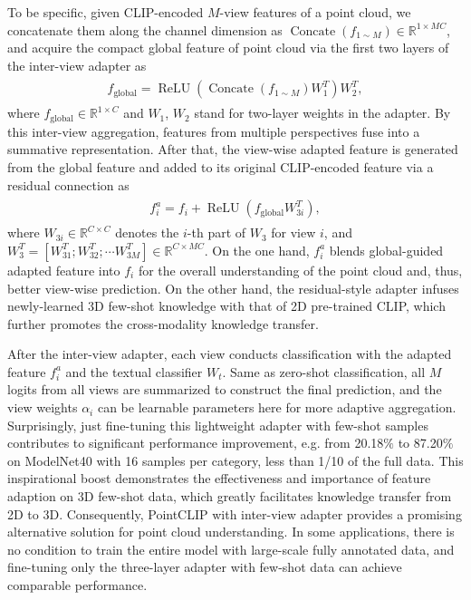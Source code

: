 \documentclass[10pt,twocolumn,letterpaper]{article}
\begin{document}
To be specific, given CLIP-encoded $M$-view features of a point cloud, we concatenate them along the channel dimension as  $\operatorname{Concate}(f_{1\sim M}) \in \mathbb{R}^{1 \times MC}$, and acquire the compact global feature of point cloud via the first two layers of the inter-view adapter as
\begin{align}
\label{global}
\begin{split}
    f_\mathrm{global} = \operatorname{ReLU}(\operatorname{Concate}(f_{1\sim M}) W_1^T)W_2^T,
\end{split}
\end{align}
where $f_\mathrm{global} \in \mathbb{R}^{1 \times C}$ and $W_1$, $W_2$ stand for two-layer weights in the adapter. By this inter-view aggregation, features from multiple perspectives fuse into a summative representation. After that, the view-wise adapted feature is generated from the global feature and added to its original CLIP-encoded feature via a residual connection as
\begin{align}
\label{clip_}
\begin{split}
    f_i^a = f_i + \operatorname{ReLU}(f_\mathrm{global} 
    W_{3i}^T),
\end{split}
\end{align}
where $W_{3i} \in \mathbb{R}^{C \times C}$ denotes the $i$-th part of $W_3$ for view $i$, and $W_{3}^T = [W_{31}^T; W_{32}^T;\cdots W_{3M}^T]\in \mathbb{R}^{C \times MC}$. On the one hand, $f_i^a$ blends global-guided adapted feature into $f_i$ for the overall understanding of the point cloud and, thus, better view-wise prediction. On the other hand, the residual-style adapter infuses newly-learned 3D few-shot knowledge with that of 2D pre-trained CLIP, which further promotes the cross-modality knowledge transfer.

After the inter-view adapter, each view conducts classification with the adapted feature $f_i^a$ and the textual classifier $W_t$. Same as zero-shot classification, all $M$ logits from all views are summarized to construct the final prediction, and the view weights $\alpha_i$ can be learnable parameters here for more adaptive aggregation. Surprisingly, just fine-tuning this lightweight adapter with few-shot samples contributes to significant performance improvement, e.g. from 20.18$\%$ to 87.20$\%$ on ModelNet40 with 16 samples per category, less than 1/10 of the full data. This inspirational boost demonstrates the effectiveness and importance of feature adaption on 3D few-shot data, which greatly facilitates knowledge transfer from 2D to 3D. Consequently, PointCLIP with inter-view adapter provides a promising alternative solution for point cloud understanding. In some applications, there is no condition to train the entire model with large-scale fully annotated data, and fine-tuning only the three-layer adapter with few-shot data can achieve comparable performance.
\end{document}
